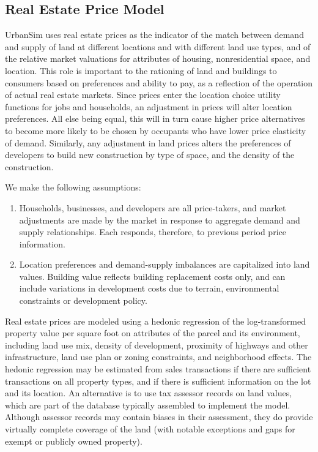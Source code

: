 \subsection{Real Estate Price Model}
%
\label{sec:model-system-real-estate-price-model}
%
UrbanSim uses real estate prices as the indicator of the match between
demand and supply of land at different locations and with
different land use types, and of the relative market valuations
for attributes of housing, nonresidential space, and location.
This role is important to the rationing of land and buildings to
consumers based on preferences and ability to pay, as a reflection
of the operation of actual real estate markets. Since prices enter
the location choice utility functions for jobs and households, an
adjustment in prices will alter location preferences.  All else
being equal, this will in turn cause higher price alternatives to
become more likely to be chosen by occupants who have lower price
elasticity of demand. Similarly, any adjustment in land prices
alters the preferences of developers to build new construction by
type of space, and the density of the construction.

We make the following assumptions:

\begin{enumerate}
\item Households, businesses, and developers are all
price-takers, and market adjustments are made by the market in
response to aggregate demand and supply relationships.  Each
responds, therefore, to previous period price information.

\item
Location preferences and demand-supply imbalances are capitalized
into land values.  Building value reflects building replacement
costs only, and can include variations in development costs due to
terrain, environmental constraints or development policy.

\end{enumerate}

Real estate prices are modeled using a hedonic regression of the log-transformed
property value per square foot
on attributes of the parcel and its environment, including land use
mix, density of development, proximity of highways and other
infrastructure, land use plan or zoning constraints, and
neighborhood effects.  The hedonic regression may be estimated
from sales transactions if there are sufficient transactions on
all property types, and if there is sufficient information on the
lot and its location.  An alternative is to use tax assessor
records on land values, which are part of the database typically
assembled to implement the model.  Although assessor records may
contain biases in their assessment, they do provide virtually
complete coverage of the land (with notable exceptions and gaps
for exempt or publicly owned property).


